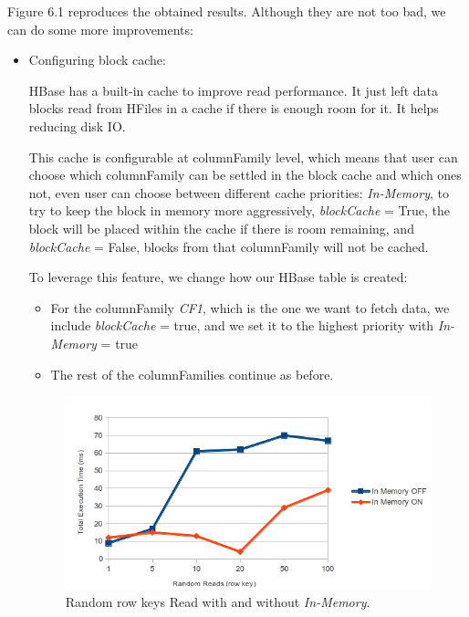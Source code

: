 \bigskip

Figure 6.1 reproduces the obtained results. Although they are not too bad, we can do some more improvements:
\begin{itemize}
\item Configuring block cache:
\par 
HBase has a built-in cache to improve read performance. It just left data blocks read from HFiles in a cache if there is enough room for it. It helps reducing disk IO.
\par
 This cache is configurable at columnFamily level, which means that user can choose which columnFamily can be settled in the block cache and which ones not, even user can choose between different cache priorities: \textit{In-Memory}, to try to keep the block in memory more aggressively, \textit{blockCache} = True, the block will be placed within the cache if there is room remaining, and \textit{blockCache} = False, blocks from that columnFamily will not be cached.
\par 
To leverage this feature, we change how our HBase table is created: 
\begin{itemize}
\item For the columnFamily \textit{CF1}, which is the one we want to fetch data, we include \textit{blockCache} = true, and we set it to the highest priority with \textit{In-Memory} = true
\item The rest of the columnFamilies continue as before.
\end{itemize}


\begin{figure}[htb]
\centering
\hspace*{0.21in}
\includegraphics[width=1\textwidth]{./images/inMemory2.png}
\caption{Random row keys Read with and without \textit{In-Memory}.} \label{fig:inMemoryReads}
\end{figure}



\end{itemize}
